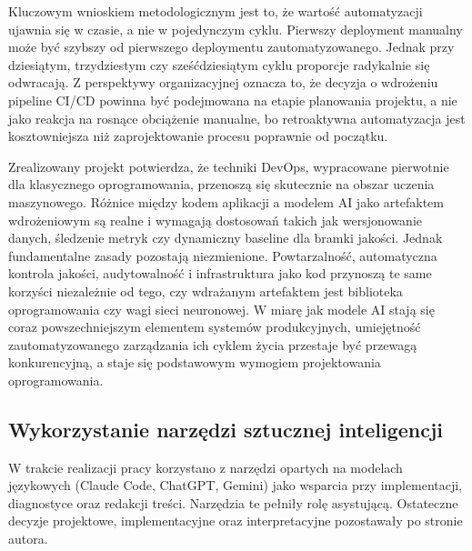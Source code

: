 Kluczowym wnioskiem metodologicznym jest to, że wartość automatyzacji ujawnia się w czasie, a nie w pojedynczym cyklu. Pierwszy deployment manualny może być szybszy od pierwszego deploymentu zautomatyzowanego. Jednak przy dziesiątym, trzydziestym czy sześćdziesiątym cyklu proporcje radykalnie się odwracają. Z perspektywy organizacyjnej oznacza to, że decyzja o wdrożeniu pipeline CI/CD powinna być podejmowana na etapie planowania projektu, a nie jako reakcja na rosnące obciążenie manualne, bo retroaktywna automatyzacja jest kosztowniejsza niż zaprojektowanie procesu poprawnie od początku.

Zrealizowany projekt potwierdza, że techniki DevOps, wypracowane pierwotnie dla klasycznego oprogramowania, przenoszą się skutecznie na obszar uczenia maszynowego. Różnice między kodem aplikacji a modelem AI jako artefaktem wdrożeniowym są realne i wymagają dostosowań takich jak wersjonowanie danych, śledzenie metryk czy dynamiczny baseline dla bramki jakości. Jednak fundamentalne zasady pozostają niezmienione. Powtarzalność, automatyczna kontrola jakości, audytowalność i infrastruktura jako kod przynoszą te same korzyści niezależnie od tego, czy wdrażanym artefaktem jest biblioteka oprogramowania czy wagi sieci neuronowej. W miarę jak modele AI stają się coraz powszechniejszym elementem systemów produkcyjnych, umiejętność zautomatyzowanego zarządzania ich cyklem życia przestaje być przewagą konkurencyjną, a staje się podstawowym wymogiem projektowania oprogramowania.

\subsection{Wykorzystanie narzędzi sztucznej inteligencji}

W trakcie realizacji pracy korzystano z narzędzi opartych na modelach językowych (Claude Code, ChatGPT, Gemini) jako wsparcia przy implementacji, diagnostyce oraz redakcji treści. Narzędzia te pełniły rolę asystującą. Ostateczne decyzje projektowe, implementacyjne oraz interpretacyjne pozostawały po stronie autora.
